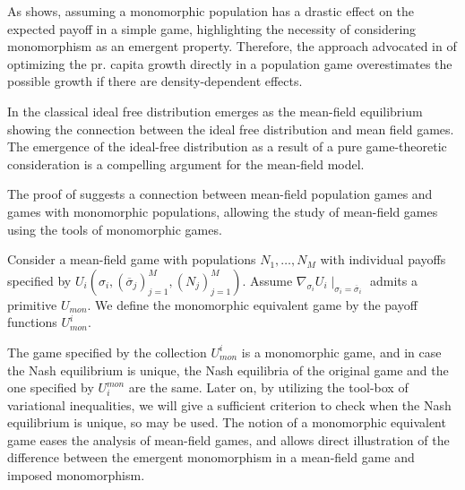 As  shows, assuming a monomorphic population has a drastic effect on the expected payoff in a simple game, highlighting the necessity of considering monomorphism as an emergent property. Therefore, the approach advocated in \citep{vincent2005evolutionary} of optimizing the pr. capita growth directly in a population game overestimates the possible growth if there are density-dependent effects.


In  the classical ideal free distribution emerges as the mean-field equilibrium showing the connection between the ideal free distribution and mean field games. The emergence of the ideal-free distribution as a result of a pure game-theoretic consideration is a compelling argument for the mean-field model.

The proof of  suggests a connection between mean-field population games and games with monomorphic populations, allowing the study of mean-field games using the tools of monomorphic games.
\begin{definition}
  \label{def:correspondence}
  Consider a mean-field game with populations $N_1,\dots,N_M$ with individual payoffs specified by $U_i(\sigma_i, (\overbar{\sigma}_j)_{j=1}^M, (N_j)_{j=1}^M)$. Assume $\nabla_{\sigma_i}U_i\mid_{\sigma_i=\overbar{\sigma}_i}$ admits a primitive $U_{mon}$. We define the monomorphic equivalent game by the payoff functions $U^i_{mon}$.
\end{definition}
The game specified by the collection $U^i_{mon}$ is a monomorphic game, and in case the Nash equilibrium is unique, the Nash equilibria of the original game and the one specified by $U_i^{mon}$ are the same. Later on, by utilizing the tool-box of variational inequalities, we will give a sufficient criterion to check when the Nash equilibrium is unique, so  may be used. The notion of a monomorphic equivalent game eases the analysis of mean-field games, and allows direct illustration of the difference between the emergent monomorphism in a mean-field game and imposed monomorphism.


